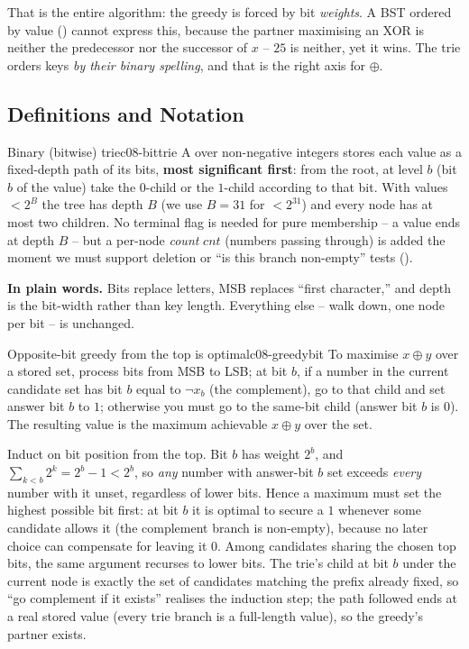 That is the entire algorithm: the greedy is forced by bit \emph{weights}. A BST ordered by value
() cannot express this, because the partner maximising an XOR is neither the predecessor nor
the successor of $x$ -- $25$ is neither, yet it wins. The trie orders keys \emph{by their binary spelling},
and that is the right axis for $\oplus$.

\subsection{Definitions and Notation}

\begin{definition}{Binary (bitwise) trie}{c08-bittrie}
A  over non-negative integers stores each value as a fixed-depth path of its bits,
\textbf{most significant first}: from the root, at level $b$ (bit $b$ of the value) take the $0$-child or
the $1$-child according to that bit. With values $<2^{B}$ the tree has depth $B$ (we use $B=31$ for
$<2^{31}$) and every node has at most two children. No terminal flag is needed for pure membership -- a
value ends at depth $B$ -- but a per-node \emph{count} $\mathit{cnt}$ (numbers passing through) is added
the moment we must support deletion or ``is this branch non-empty'' tests ().
\end{definition}

\noindent\textbf{In plain words.} Bits replace letters, MSB replaces ``first character,'' and depth is the
bit-width rather than key length. Everything else -- walk down, one node per bit -- is
 unchanged.

\begin{lemma}{Opposite-bit greedy from the top is optimal}{c08-greedybit}
To maximise $x \oplus y$ over a stored set, process bits from MSB to LSB; at bit $b$, if a number in the
current candidate set has bit $b$ equal to $\lnot x_b$ (the complement), go to that child and set answer
bit $b$ to $1$; otherwise you must go to the same-bit child (answer bit $b$ is $0$). The resulting value
is the maximum achievable $x\oplus y$ over the set.
\end{lemma}
\begin{proofbox}
Induct on bit position from the top. Bit $b$ has weight $2^b$, and $\sum_{k<b} 2^k = 2^{b}-1 < 2^b$, so
\emph{any} number with answer-bit $b$ set exceeds \emph{every} number with it unset, regardless of lower
bits. Hence a maximum must set the highest possible bit first: at bit $b$ it is optimal to secure a $1$
whenever some candidate allows it (the complement branch is non-empty), because no later choice can
compensate for leaving it $0$. Among candidates sharing the chosen top bits, the same argument recurses
to lower bits. The trie's child at bit $b$ under the current node is exactly the set of candidates
matching the prefix already fixed, so ``go complement if it exists'' realises the induction step; the path
followed ends at a real stored value (every trie branch is a full-length value), so the greedy's partner
exists. \end{proofbox}

